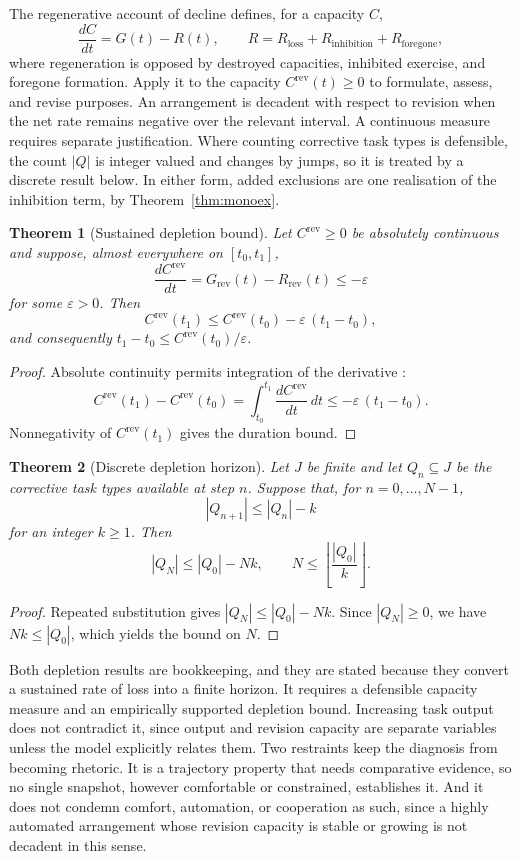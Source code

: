 \documentclass[11pt]{article}
\newtheorem{theorem}{Theorem}
\theoremstyle{definition}
\theoremstyle{remark}
\begin{document}
The regenerative account of decline \cite{flyxionDecadence} defines, for a capacity $C$,
\[
\frac{dC}{dt}=G(t)-R(t),\qquad R=R_{\mathrm{loss}}+R_{\mathrm{inhibition}}+R_{\mathrm{foregone}},
\]
where regeneration is opposed by destroyed capacities, inhibited exercise, and foregone formation. Apply it to the capacity $C^{\mathrm{rev}}(t)\ge0$ to formulate, assess, and revise purposes. An arrangement is decadent with respect to revision when the net rate remains negative over the relevant interval. A continuous measure requires separate justification. Where counting corrective task types is defensible, the count $|Q|$ is integer valued and changes by jumps, so it is treated by a discrete result below. In either form, added exclusions are one realisation of the inhibition term, by Theorem~\ref{thm:monoex}.

\begin{theorem}[Sustained depletion bound]\label{thm:deplete}
Let $C^{\mathrm{rev}}\ge0$ be absolutely continuous and suppose, almost everywhere on $[t_0,t_1]$,
\[
\frac{dC^{\mathrm{rev}}}{dt}=G_{\mathrm{rev}}(t)-R_{\mathrm{rev}}(t)\le-\varepsilon
\]
for some $\varepsilon>0$. Then
\[
C^{\mathrm{rev}}(t_1)\le C^{\mathrm{rev}}(t_0)-\varepsilon\,(t_1-t_0),
\]
and consequently $t_1-t_0\le C^{\mathrm{rev}}(t_0)/\varepsilon$.
\end{theorem}
\begin{proof}
Absolute continuity permits integration of the derivative \cite{folland1999}:
\[
C^{\mathrm{rev}}(t_1)-C^{\mathrm{rev}}(t_0)=\int_{t_0}^{t_1}\frac{dC^{\mathrm{rev}}}{dt}\,dt\le-\varepsilon\,(t_1-t_0).
\]
Nonnegativity of $C^{\mathrm{rev}}(t_1)$ gives the duration bound. \qedhere
\end{proof}

\begin{theorem}[Discrete depletion horizon]\label{thm:discrete}
Let $J$ be finite and let $Q_n\subseteq J$ be the corrective task types available at step $n$. Suppose that, for $n=0,\ldots,N-1$,
\[
|Q_{n+1}|\le|Q_n|-k
\]
for an integer $k\ge1$. Then
\[
|Q_N|\le|Q_0|-Nk,\qquad N\le\left\lfloor\frac{|Q_0|}{k}\right\rfloor.
\]
\end{theorem}
\begin{proof}
Repeated substitution gives $|Q_N|\le|Q_0|-Nk$. Since $|Q_N|\ge0$, we have $Nk\le|Q_0|$, which yields the bound on $N$. \qedhere
\end{proof}

Both depletion results are bookkeeping, and they are stated because they convert a sustained rate of loss into a finite horizon. It requires a defensible capacity measure and an empirically supported depletion bound. Increasing task output does not contradict it, since output and revision capacity are separate variables unless the model explicitly relates them. Two restraints keep the diagnosis from becoming rhetoric. It is a trajectory property that needs comparative evidence, so no single snapshot, however comfortable or constrained, establishes it. And it does not condemn comfort, automation, or cooperation as such, since a highly automated arrangement whose revision capacity is stable or growing is not decadent in this sense.
\end{document}
